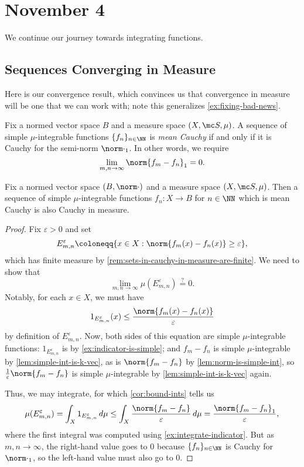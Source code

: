 \documentclass[../notes.tex]{subfiles}
\begin{document}
\section{November 4}

We continue our journey towards integrating functions.

\subsection{Sequences Converging in Measure}
Here is our convergence result, which convinces us that convergence in measure will be one that we can work with; note this generalizes \autoref{ex:fixing-bad-news}.
\begin{defi}
	Fix a normed vector space $B$ and a measure space $(X,\mc S,\mu)$. A sequence of simple $\mu$-integrable functions $\{f_n\}_{n\in\NN}$ is \textit{mean Cauchy} if and only if it is Cauchy for the semi-norm $\norm\cdot_1$. In other words, we require
	\[\lim_{m,n\to\infty}\norm{f_m-f_n}_1=0.\]
\end{defi}
\begin{lemma}
	Fix a normed vector space $(B,\norm\cdot)$ and a measure space $(X,\mc S,\mu)$. Then a sequence of simple $\mu$-integrable functions $f_n\colon X\to B$ for $n\in\NN$ which is mean Cauchy is also Cauchy in measure.
\end{lemma}
\begin{proof}
	Fix $\varepsilon>0$ and set
	\[E^\varepsilon_{m,n}\coloneqq\{x\in X:\norm{f_m(x)-f_n(x)}\ge\varepsilon\},\]
	which has finite measure by \autoref{rem:sets-in-cauchy-in-measure-are-finite}. We need to show that
	\[\lim_{m,n\to\infty}\mu(E_{m,n}^\varepsilon)\stackrel?=0.\]
	Notably, for each $x\in X$, we must have
	\begin{equation}
		1_{E^\varepsilon_{m,n}}(x)\le\frac{\norm{f_m(x)-f_n(x)}}\varepsilon \label{eq:bound-indicator-e-m-n}
	\end{equation}
	by definition of $E^{\varepsilon}_{m,n}$. Now, both sides of this equation are simple $\mu$-integrable functions: $1_{E^\varepsilon_{m,n}}$ is by \autoref{ex:indicator-is-simple}; and $f_m-f_n$ is simple $\mu$-integrable by \autoref{lem:simple-int-is-k-vec}, as is $\norm{f_m-f_n}$ by \autoref{lem:norm-is-simple-int}, so $\frac1\varepsilon\norm{f_m-f_n}$ is simple $\mu$-integrable by \autoref{lem:simple-int-is-k-vec} again.
	
	Thus, we may integrate, for which \autoref{cor:bound-ints} tells us
	\[\mu(E^\varepsilon_{m,n})=\int_X1_{E^{\varepsilon}_{m,n}}\,d\mu\le\int_X\frac{\norm{f_m-f_n}}\varepsilon\,d\mu=\frac{\norm{f_m-f_n}_1}\varepsilon,\]
	where the first integral was computed using \autoref{ex:integrate-indicator}. But as $m,n\to\infty$, the right-hand value goes to $0$ because $\{f_n\}_{n\in\NN}$ is Cauchy for $\norm\cdot_1$, so the left-hand value must also go to $0$.
\end{proof}
\end{document}

